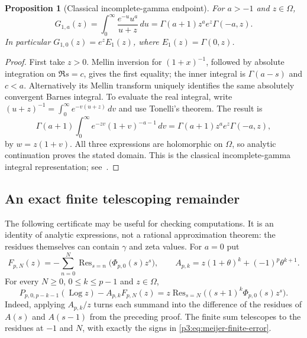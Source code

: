\documentclass[11pt,a4paper]{article}
\newtheorem{proposition}[theorem]{Proposition}
\theoremstyle{definition}
\theoremstyle{remark}
\DeclareMathOperator{\Log}{Log}
\numberwithin{equation}{section}
\begin{document}
\begin{proposition}[Classical incomplete-gamma endpoint]\label{p3:prop:meijer-p1}
For $a>-1$ and $z\in\Omega$,
\[
 G_{1,a}(z)=\int_0^\infty\frac{e^{-u}u^a}{u+z}\,du
   =\Gamma(a+1)z^a e^z\Gamma(-a,z).
\]
In particular $G_{1,0}(z)=e^z E_1(z)$, where $E_1(z)=\Gamma(0,z)$.
\end{proposition}
\begin{proof}
First take $z>0$. Mellin inversion for $(1+x)^{-1}$, followed by absolute
integration on $\Re s=c$, gives the first equality; the inner integral
is $\Gamma(a-s)$ and $c<a$. Alternatively its Mellin transform uniquely
identifies the same absolutely convergent Barnes integral. To evaluate the
real integral, write $(u+z)^{-1}=\int_0^\infty e^{-v(u+z)}\,dv$ and use
Tonelli's theorem. The result is
\[
 \Gamma(a+1)\int_0^\infty e^{-zv}(1+v)^{-a-1}\,dv
   =\Gamma(a+1)z^ae^z\Gamma(-a,z),
\]
by $w=z(1+v)$. All three expressions are holomorphic on $\Omega$, so
analytic continuation proves the stated domain. This is the classical
incomplete-gamma integral representation; see~\cite[\S8.6]{p3:DLMF}.
\end{proof}

\subsection*{An exact finite telescoping remainder}
The following certificate may be useful for checking computations. It is
an identity of analytic expressions, not a rational approximation theorem:
the residues themselves can contain $\gamma$ and zeta values.
For $a=0$ put
\[
 F_{p,N}(z)=-\sum_{n=0}^N
       \operatorname{Res}_{s=n}\bigl(\Phi_{p,0}(s)z^s\bigr),
 \qquad A_{p,k}=z(1+\theta)^k+(-1)^p\theta^{k+1}.
\]
For every $N\ge0$, $0\le k\le p-1$ and $z\in\Omega$,
\begin{equation}\label{p3:eq:meijer-finite-error}
 P_{p,0,p-k-1}(\Log z)-A_{p,k}F_{p,N}(z)
 =z\operatorname{Res}_{s=N}
       \bigl((s+1)^k\Phi_{p,0}(s)z^s\bigr).
\end{equation}
Indeed, applying $A_{p,k}/z$ turns each summand into the difference of the
residues of $A(s)$ and $A(s-1)$ from the preceding proof. The finite sum
telescopes to the residues at $-1$ and $N$, with exactly the signs in
\eqref{p3:eq:meijer-finite-error}.
\end{document}
